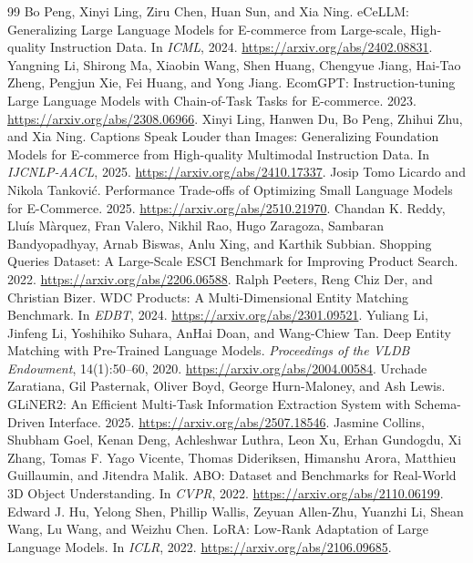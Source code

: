 \begin{thebibliography}{99}
 Bo Peng, Xinyi Ling, Ziru Chen, Huan Sun, and Xia Ning. eCeLLM: Generalizing Large Language Models for E-commerce from Large-scale, High-quality Instruction Data. In \emph{ICML}, 2024. \url{https://arxiv.org/abs/2402.08831}.
 Yangning Li, Shirong Ma, Xiaobin Wang, Shen Huang, Chengyue Jiang, Hai-Tao Zheng, Pengjun Xie, Fei Huang, and Yong Jiang. EcomGPT: Instruction-tuning Large Language Models with Chain-of-Task Tasks for E-commerce. 2023. \url{https://arxiv.org/abs/2308.06966}.
 Xinyi Ling, Hanwen Du, Bo Peng, Zhihui Zhu, and Xia Ning. Captions Speak Louder than Images: Generalizing Foundation Models for E-commerce from High-quality Multimodal Instruction Data. In \emph{IJCNLP-AACL}, 2025. \url{https://arxiv.org/abs/2410.17337}.
 Josip Tomo Licardo and Nikola Tankovi\'{c}. Performance Trade-offs of Optimizing Small Language Models for E-Commerce. 2025. \url{https://arxiv.org/abs/2510.21970}.
 Chandan K. Reddy, Llu\'{i}s M\`arquez, Fran Valero, Nikhil Rao, Hugo Zaragoza, Sambaran Bandyopadhyay, Arnab Biswas, Anlu Xing, and Karthik Subbian. Shopping Queries Dataset: A Large-Scale ESCI Benchmark for Improving Product Search. 2022. \url{https://arxiv.org/abs/2206.06588}.
 Ralph Peeters, Reng Chiz Der, and Christian Bizer. WDC Products: A Multi-Dimensional Entity Matching Benchmark. In \emph{EDBT}, 2024. \url{https://arxiv.org/abs/2301.09521}.
 Yuliang Li, Jinfeng Li, Yoshihiko Suhara, AnHai Doan, and Wang-Chiew Tan. Deep Entity Matching with Pre-Trained Language Models. \emph{Proceedings of the VLDB Endowment}, 14(1):50--60, 2020. \url{https://arxiv.org/abs/2004.00584}.
 Urchade Zaratiana, Gil Pasternak, Oliver Boyd, George Hurn-Maloney, and Ash Lewis. GLiNER2: An Efficient Multi-Task Information Extraction System with Schema-Driven Interface. 2025. \url{https://arxiv.org/abs/2507.18546}.
 Jasmine Collins, Shubham Goel, Kenan Deng, Achleshwar Luthra, Leon Xu, Erhan Gundogdu, Xi Zhang, Tomas F. Yago Vicente, Thomas Dideriksen, Himanshu Arora, Matthieu Guillaumin, and Jitendra Malik. ABO: Dataset and Benchmarks for Real-World 3D Object Understanding. In \emph{CVPR}, 2022. \url{https://arxiv.org/abs/2110.06199}.
 Edward J. Hu, Yelong Shen, Phillip Wallis, Zeyuan Allen-Zhu, Yuanzhi Li, Shean Wang, Lu Wang, and Weizhu Chen. LoRA: Low-Rank Adaptation of Large Language Models. In \emph{ICLR}, 2022. \url{https://arxiv.org/abs/2106.09685}.

\end{thebibliography}
